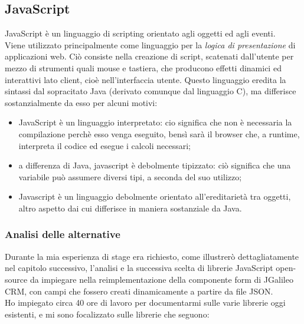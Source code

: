 \subsection{JavaScript}
JavaScript è un linguaggio di scripting orientato agli oggetti ed agli eventi.\\
Viene utilizzato principalmente come linguaggio per la \emph{logica di presentazione} di applicazioni web. Ciò consiste nella creazione di \gls{script}, scatenati dall'utente per mezzo di strumenti quali mouse e tastiera, che producono effetti dinamici ed interattivi lato client, cioè nell'interfaccia utente.
Questo linguaggio eredita la sintassi dal sopracitato Java (derivato comunque dal linguaggio C), ma differisce sostanzialmente da esso per alcuni motivi:
\begin{itemize}
	\item JavaScript è un linguaggio interpretato: cio significa che non è necessaria la compilazione perchè esso venga eseguito, bensì sarà il browser che, a runtime, interpreta il codice ed esegue i calcoli necessari;
	\item a differenza di Java, javascript è debolmente tipizzato: ciò significa che una variabile può assumere diversi tipi, a seconda del suo utilizzo;
	\item Javascript è un linguaggio debolmente orientato all'ereditarietà tra oggetti, altro aspetto dai cui differisce in maniera sostanziale da Java. 
\end{itemize}
\subsubsection{Analisi delle alternative}
Durante la mia esperienza di stage era richiesto, come illustrerò dettagliatamente nel capitolo successivo, l'analisi e la successiva scelta di librerie JavaScript open-source da impiegare nella reimplementazione della componente form di JGalileo CRM, con campi che fossero creati dinamicamente a partire da file JSON. \\ 
Ho impiegato circa 40 ore di lavoro per documentarmi sulle varie librerie oggi esistenti, e mi sono focalizzato sulle librerie che seguono:

